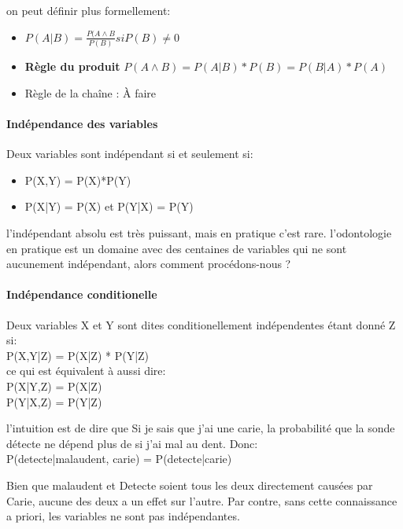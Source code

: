\documentclass[oneside]{book}
\begin{document}
on peut définir plus formellement:
\begin{itemize}
\item $P(A|B) = \frac{P(A\wedge B}{P(B)} si P(B) \neq 0$
\item \textbf{Règle du produit} $P(A\wedge B) = P(A|B)*P(B) = P(B|A) * P(A)$
\item Règle de la chaîne : À faire
\end{itemize}

\paragraph{Indépendance des variables}
Deux variables sont indépendant si et seulement si:\\
\begin{itemize}
\item P(X,Y) = P(X)*P(Y)
\item P(X|Y) = P(X) et P(Y|X) = P(Y)
\end{itemize}

l'indépendant absolu est très puissant, mais en pratique c'est rare. l'odontologie en pratique est un domaine avec des centaines de variables qui ne sont aucunement indépendant, alors comment procédons-nous ?\\

\paragraph{Indépendance conditionelle}
Deux variables X et Y sont dites conditionellement indépendentes étant donné Z si:\\

\centering
P(X,Y|Z) = P(X|Z) * P(Y|Z)\\

ce qui est équivalent à aussi dire:\\

P(X|Y,Z) = P(X|Z)\\
P(Y|X,Z) = P(Y|Z)\\
\justify 

l'intuition est de dire que Si je sais que j'ai une carie, la probabilité que la sonde détecte ne dépend plus de si j'ai mal au dent. Donc:\\

\centering
P(detecte|malaudent, carie) = P(detecte|carie)\\
\justify

Bien que malaudent et Detecte soient tous les deux directement causées par Carie, aucune des deux a un effet sur l'autre. Par contre, sans cette connaissance a priori, les variables ne sont pas indépendantes.\\
\end{document}
